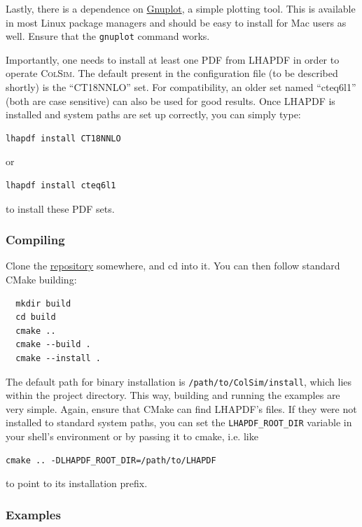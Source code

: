 Lastly, there is a dependence on \href{http://gnuplot.info/}{Gnuplot}, a simple plotting tool. This is available in most Linux package managers and should be easy to install for Mac users as well. Ensure that the \texttt{gnuplot} command works.

Importantly, one needs to install at least one PDF from LHAPDF in order to operate \textsc{ColSim}. The default present in the configuration file (to be described shortly) is the ``CT18NNLO'' set. For compatibility, an older set named ``cteq6l1'' (both are case sensitive) can also be used for good results. Once LHAPDF is installed and system paths are set up correctly, you can simply type:

\begin{verbatim}
lhapdf install CT18NNLO
\end{verbatim}

or

\begin{verbatim}
lhapdf install cteq6l1
\end{verbatim}

to install these PDF sets.


\subsubsection{Compiling}

Clone the \href{https://github.com/champso1/ColSim}{repository} somewhere, and cd into it. You can then follow standard CMake building:

\begin{verbatim}
  mkdir build
  cd build
  cmake ..
  cmake --build .
  cmake --install .
\end{verbatim}

The default path for binary installation is \texttt{/path/to/ColSim/install}, which lies within the project directory. This way, building and running the examples are very simple. Again, ensure that CMake can find LHAPDF's files. If they were not installed to standard system paths, you can set the \texttt{LHAPDF_ROOT_DIR} variable in your shell's environment or by passing it to cmake, i.e. like

\begin{verbatim}
cmake .. -DLHAPDF_ROOT_DIR=/path/to/LHAPDF
\end{verbatim}

to point to its installation prefix.

\subsubsection{Examples}

